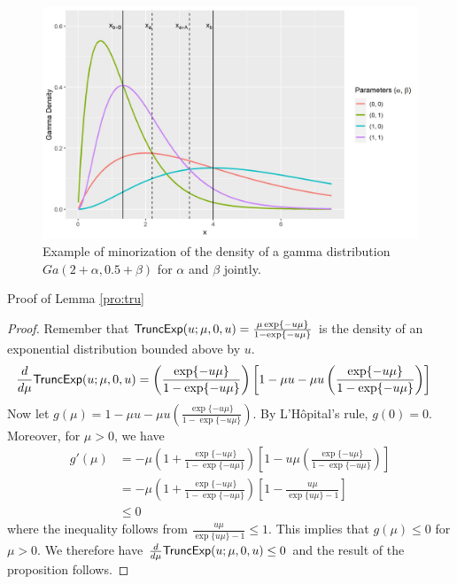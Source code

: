 \documentclass[11pt]{article}
\begin{document}
	
	\begin{figure}	
		\centering
		\includegraphics[width=\textwidth]{gamma_minorization_2.jpg}
		\caption{Example of minorization of the density of a gamma distribution $Ga(2+\alpha, 0.5+\beta)$ for $\alpha$ and $\beta$ jointly.}
		\label{fig:gam2}
	\end{figure}
	
	Proof of Lemma \ref{pro:tru}
	
	\begin{proof}
		Remember that $\textsf{TruncExp}(u; \mu, 0, u) = \frac{\mu \exp\{-u\mu\}}{1-\exp\{-u\mu\}}$ is the density of an exponential distribution bounded above by $u$.
		\begin{align*}
			\frac{d}{d\mu}\textsf{TruncExp}(u; \mu, 0, u)
			& = \left(\frac{\exp\{-u\mu\}}{1-\exp\{-u\mu\}} \right) \left[ 1-\mu u - \mu u \left(\frac{\exp\{-u\mu\}}{1-\exp\{-u\mu\}} \right) \right]
		\end{align*}
		Now let $g(\mu) = 1-\mu u - \mu u \left(\frac{\exp\{-u\mu\}}{1-\exp\{-u\mu\}} \right)$. By L'H\^{o}pital's rule, $g(0) = 0$. Moreover, for $\mu>0$, we have
		\begin{align*}
			g'(\mu)
			& = - \mu \left(1+\frac{\exp\{-u\mu\}}{1-\exp\{-u\mu\}} \right) \left[ 1-u\mu \left(\frac{\exp\{-u\mu\}}{1-\exp\{-u\mu\}} \right) \right]  \\
			& = - \mu \left(1+\frac{\exp\{-u\mu\}}{1-\exp\{-u\mu\}} \right) \left[ 1- \frac{u\mu}{\exp\{u\mu\}-1} \right] \\
			& \le 0
		\end{align*}
		where the inequality follows from $\frac{u\mu}{\exp\{u\mu\}-1}\le1$.
		This implies that $g(\mu) \le 0$ for $\mu>0$. We therefore have $\frac{d}{d\mu}\textsf{TruncExp}(u; \mu, 0, u) \le 0$ and the result of the proposition follows.
	\end{proof}

	
	
	
	
\end{document}
